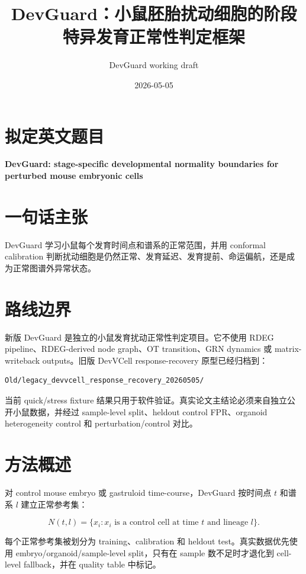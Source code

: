 \documentclass[11pt]{article}
\title{DevGuard：小鼠胚胎扰动细胞的阶段特异发育正常性判定框架}
\author{DevGuard working draft}
\date{2026-05-05}
\begin{document}
\maketitle

\section*{拟定英文题目}

\textbf{DevGuard: stage-specific developmental normality boundaries for perturbed mouse embryonic cells}

\section*{一句话主张}

DevGuard 学习小鼠每个发育时间点和谱系的正常范围，并用 conformal calibration 判断扰动细胞是仍然正常、发育延迟、发育提前、命运偏航，还是成为正常图谱外异常状态。

\section*{路线边界}

新版 DevGuard 是独立的小鼠发育扰动正常性判定项目。它不使用 RDEG pipeline、RDEG-derived node graph、OT transition、GRN dynamics 或 matrix-writeback outputs。旧版 DevVCell response-recovery 原型已经归档到：

\begin{verbatim}
Old/legacy_devvcell_response_recovery_20260505/
\end{verbatim}

当前 quick/stress fixture 结果只用于软件验证。真实论文主结论必须来自独立公开小鼠数据，并经过 sample-level split、heldout control FPR、organoid heterogeneity control 和 perturbation/control 对比。

\section*{方法概述}

对 control mouse embryo 或 gastruloid time-course，DevGuard 按时间点 \(t\) 和谱系 \(l\) 建立正常参考集：

\[
N(t,l)=\{x_i: x_i \text{ is a control cell at time } t \text{ and lineage } l\}.
\]

每个正常参考集被划分为 training、calibration 和 heldout test。真实数据优先使用 embryo/organoid/sample-level split，只有在 sample 数不足时才退化到 cell-level fallback，并在 quality table 中标记。
\end{document}
